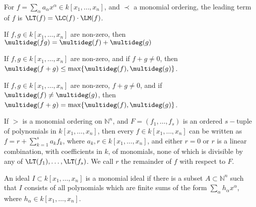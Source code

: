 \documentclass[crop=false,class=book,oneside]{standalone}
\begin{document}
                \begin{definition}
                    For
                    $f=\sum_{\alpha}%
                       a_{\alpha}x^{\alpha}\in{k}[x_{1},\hdots,x_{n}]$,
                    and $\prec$ a monomial ordering,
                    the leading term of $f$ is
                    $\LT(f)=\LC(f)\cdot\LM(f)$.
                \end{definition}
                \begin{theorem}
                    If $f,g\in k[x_1,\hdots ,x_n]$ are non-zero,
                    then $\multideg(fg)=\multideg(f)+\multideg(g)$
                \end{theorem}
                \begin{theorem}
                    If $f,g\in k[x_1,\hdots ,x_n]$ are non-zero,
                    and if $f+g\ne 0$, then
                    $\multideg(f+g)\leq\max\{\multideg(f),\multideg(g)\}$.
                \end{theorem}
                \begin{theorem}
                    If $f,g\in k[x_1,\hdots ,x_n]$ are non-zero,
                    $f+g\ne 0$, and if
                    $\multideg(f)\ne\multideg(g)$, then
                    $\multideg(f+g)=\max\{\multideg(f),\multideg(g)\}$.
                \end{theorem}
                \begin{theorem}
                    If $>$ is a monomial ordering on $\mathbb{N}^n$,
                    and $F=(f_1,\hdots,f_s)$ is an ordered $s-$tuple
                    of polynomials in $k[x_1,\hdots ,x_n]$,
                    then every $f\in k[x_1,\hdots ,x_n]$ can be
                    written as $f=r+\sum_{k=1}^{s}a_{k}f_{k}$,
                    where $a_{k},r\in{k}[x_{1},\hdots,x_{n}]$,
                    and either $r=0$ or $r$ is a linear combination,
                    with coefficients in $k$, of monomials, none of
                    which is divisible by any of
                    $\LT(f_{1}),\hdots,\LT(f_{s})$.
                    We call $r$ the remainder of $f$
                    with respect to $F$.
                \end{theorem}
                \begin{definition}
                    An ideal $I\subset k[x_1,\hdots ,x_n]$ is a
                    monomial ideal if there is a subset
                    $A\subset\mathbb{N}^{n}$ such that $I$ consists
                    of all polynomials which are finite sums of
                    the form $\sum_{\alpha} h_{\alpha}x^{\alpha}$,
                    where $h_{\alpha}\in {k}[x_{1},\hdots,x_{n}]$. 
                \end{definition}
\end{document}
